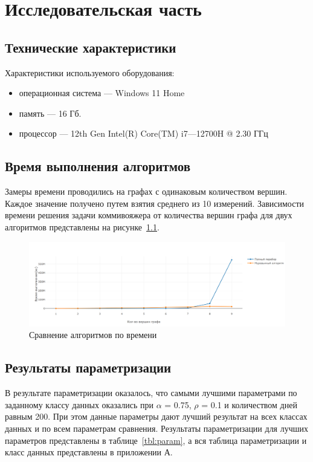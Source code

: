 \chapter{Исследовательская часть}

\section{Технические характеристики}
Характеристики используемого оборудования:
\begin{itemize}
    \item операционная система --- Windows 11 Home
    \item память --- 16 Гб.
    \item процессор --- 12th Gen Intel(R) Core(TM) i7---12700H @  2.30 ГГц~\cite{intel}
\end{itemize}

\section{Время выполнения алгоритмов}

Замеры времени проводились на графах с одинаковым количеством вершин. Каждое значение получено путем взятия среднего из 10 измерений. Зависимости времени решения задачи коммивояжера от количества вершин графа для двух алгоритмов представлены на рисунке~\ref{fig:time_mes}.

\begin{figure}[H]
    \centering
    \includegraphics[width=1\linewidth]{images/plot.png}
    \caption{Сравнение алгоритмов по времени}
    \label{fig:time_mes}
\end{figure}

\section{Результаты параметризации}

В результате параметризации оказалось, что самыми лучшими параметрами по заданному классу данных оказались при $\alpha$ = 0.75, $\rho$ = 0.1 и количеством дней равным 200. При этом данные параметры дают лучший результат на всех классах данных и по всем параметрам сравнения. Результаты параметризации для лучших параметров представлены в таблице~\ref{tbl:param}, а
вся таблица параметризации и класс данных представлены в приложении А.


